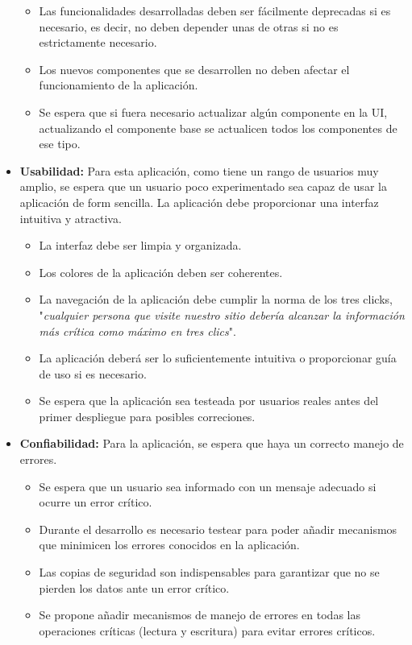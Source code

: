 \documentclass[a4paper, 12pt]{article}
\begin{document}
\begin{itemize}
\begin{itemize}
			\item Las funcionalidades desarrolladas deben ser fácilmente deprecadas si es necesario, es decir, no deben depender unas de otras si no es estrictamente necesario.
			\item Los nuevos componentes que se desarrollen no deben afectar el funcionamiento de la aplicación.
			\item Se espera que si fuera necesario actualizar algún componente en la UI, actualizando el componente base se actualicen todos los componentes de ese tipo.
		\end{itemize}
	\item \textbf{Usabilidad:} Para esta aplicación, como tiene un rango de usuarios muy amplio, se espera que un usuario poco experimentado sea capaz de usar la aplicación de form sencilla. La aplicación debe proporcionar una interfaz intuitiva y atractiva. 
		\begin{itemize}
			\item La interfaz debe ser limpia y organizada.
			\item Los colores de la aplicación deben ser coherentes.
			\item La navegación de la aplicación debe cumplir la norma de los tres clicks, "\textit{cualquier persona que visite nuestro sitio debería alcanzar la información más crítica como máximo en tres clics}".
			\item La aplicación deberá ser lo suficientemente intuitiva o proporcionar guía de uso si es necesario.
			\item Se espera que la aplicación sea testeada por usuarios reales antes del primer despliegue para posibles correciones.
		\end{itemize}
	\item \textbf{Confiabilidad:} Para la aplicación, se espera que haya un correcto manejo de errores.
		\begin{itemize}
			\item Se espera que un usuario sea informado con un mensaje adecuado si ocurre un error crítico.
			\item Durante el desarrollo es necesario testear para poder añadir mecanismos que minimicen los errores conocidos en la aplicación.
			\item Las copias de seguridad son indispensables para garantizar que no se pierden los datos ante un error crítico.
			\item Se propone añadir mecanismos de manejo de errores en todas las operaciones críticas (lectura y escritura)  para evitar errores críticos.

\end{itemize}
\end{itemize}
\end{document}
